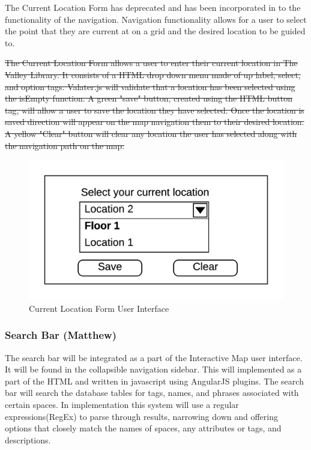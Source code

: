 \documentclass[letterpaper,10pt,titlepage, onecolumn, compsoc]{IEEEtran}
\begin{document}
The Current Location Form has deprecated and has been incorporated in to the functionality of the navigation. Navigation functionality allows for a user to select the point that they are current at on a grid and the desired location to be guided to.

\st{The Current Location Form allows a user to enter their current location in The Valley Library. It consists of a HTML drop down menu made of up label, select, and option tags. Valater.js will validate that a location has been selected using the isEmpty function.  A green "save" button, created using the HTML button tag, will allow a user to save the location they have selected. Once the location is saved direction will appear on the map navigation them to their desired location. A yellow "Clear" button will clear any location the user has selected along with the navigation path on the map.}

\begin{figure}[h!]
\centering
\includegraphics[]{images/current-location-form.png}
\caption{Current Location Form User Interface}
\label{fig:method}
\end{figure}

\subsubsection{Search Bar (Matthew)}
The search bar will be integrated as a part of the Interactive Map user interface. It will be found in the collapsible navigation sidebar. This will implemented as a part of the HTML and written in javascript using AngularJS plugins. The search bar will search the database tables for tags, names, and phrases associated with certain spaces. In implementation this system will use a regular expressions(RegEx) to parse through results, narrowing  down and offering options that closely match the names of spaces, any attributes or tags,  and descriptions. 
\end{document}
